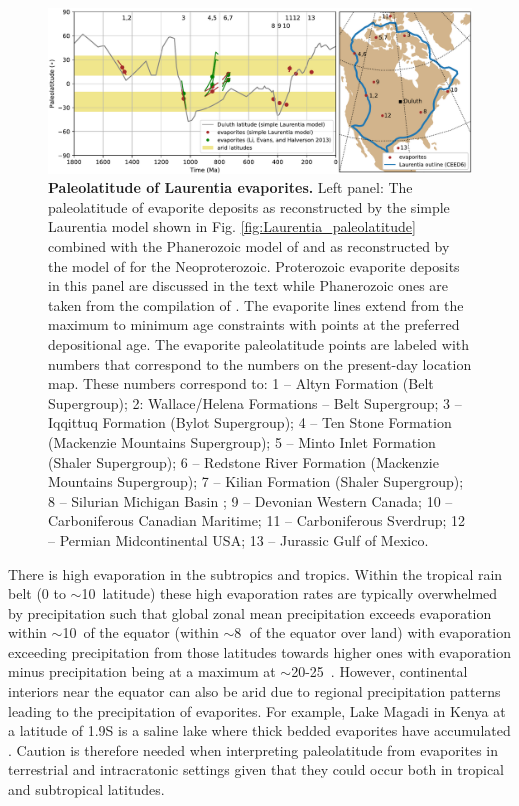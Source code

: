 \documentclass[twocolumn, switch]{article} %
\begin{document}
\begin{figure}
\centering
\includegraphics[width=7 in]{../Figures/Fig7_Laurentia_evaporite_figure.pdf}
\caption{\textbf{Paleolatitude of Laurentia evaporites.} Left panel: The paleolatitude of evaporite deposits as reconstructed by the simple Laurentia model shown in Fig. \ref{fig:Laurentia_paleolatitude} combined with the Phanerozoic model of \cite{Torsvik2017a} and as reconstructed by the model of \cite{Li2013a} for the Neoproterozoic. Proterozoic evaporite deposits in this panel are discussed in the text while Phanerozoic ones are taken from the compilation of \cite{Evans2006a}. The evaporite lines extend from the maximum to minimum age constraints with points at the preferred depositional age. The evaporite paleolatitude points are labeled with numbers that correspond to the numbers on the present-day location map. These numbers correspond to: 1 -- Altyn Formation (Belt Supergroup); 2: Wallace/Helena Formations -- Belt Supergroup; 3 -- Iqqittuq Formation (Bylot Supergroup); 4 -- Ten Stone Formation (Mackenzie Mountains Supergroup); 5 -- Minto Inlet Formation (Shaler Supergroup); 6 -- Redstone River Formation (Mackenzie Mountains Supergroup); 7 -- Kilian Formation (Shaler Supergroup); 8 -- Silurian Michigan Basin ; 9 -- Devonian Western Canada; 10 -- Carboniferous Canadian Maritime; 11 -- Carboniferous Sverdrup; 12 -- Permian Midcontinental USA; 13 -- Jurassic Gulf of Mexico.}
\label{fig:Laurentia_evaporites}
\end{figure}

There is high evaporation in the subtropics and tropics. Within the tropical rain belt (0 to $\sim$10\textdegree\ latitude) these high evaporation rates are typically overwhelmed by precipitation such that global zonal mean precipitation exceeds evaporation within $\sim$10\textdegree\ of the equator (within $\sim$8\textdegree$\;$ of the equator over land) with evaporation exceeding precipitation from those latitudes towards higher ones with evaporation minus precipitation being at a maximum at $\sim$20-25\textdegree\ \citep{Park2020b}. However, continental interiors near the equator can also be arid due to regional precipitation patterns leading to the precipitation of evaporites. For example, Lake Magadi in Kenya at a latitude of 1.9\textdegree S is a saline lake where thick bedded evaporites have accumulated \citep{Eugster1980a}. Caution is therefore needed when interpreting paleolatitude from evaporites in terrestrial and intracratonic settings given that they could occur both in tropical and subtropical latitudes.
\end{document}
